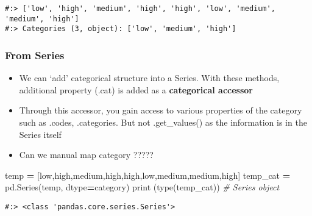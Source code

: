 \documentclass[
]{book}
\newenvironment{Shaded}{\begin{snugshade}}{\end{snugshade}}
\newcommand{\BuiltInTok}[1]{#1}
\newcommand{\CommentTok}[1]{\textcolor[rgb]{0.37,0.37,0.37}{\textit{#1}}}
\newcommand{\NormalTok}[1]{#1}
\newcommand{\OperatorTok}[1]{\textcolor[rgb]{0.43,0.43,0.43}{\textbf{#1}}}
\newcommand{\StringTok}[1]{\textcolor[rgb]{0.5,0.5,0.5}{#1}}
\providecommand{\tightlist}{%
  \setlength{\itemsep}{0pt}\setlength{\parskip}{0pt}}
\begin{document}
\begin{verbatim}
#:> ['low', 'high', 'medium', 'high', 'high', 'low', 'medium', 'medium', 'high']
#:> Categories (3, object): ['low', 'medium', 'high']
\end{verbatim}

\hypertarget{from-series}{%
\subsubsection{From Series}\label{from-series}}

\begin{itemize}
\tightlist
\item
  We can `add' categorical structure into a Series. With these methods, additional property (.cat) is added as a \textbf{categorical accessor}\\
\item
  Through this accessor, you gain access to various properties of the category such as .codes, .categories. But not .get\_values() as the information is in the Series itself\\
\item
  Can we manual map category ?????
\end{itemize}

\begin{Shaded}
\begin{Highlighting}[]
\NormalTok{temp }\OperatorTok{=}\NormalTok{ [}\StringTok{\textquotesingle{}low\textquotesingle{}}\NormalTok{,}\StringTok{\textquotesingle{}high\textquotesingle{}}\NormalTok{,}\StringTok{\textquotesingle{}medium\textquotesingle{}}\NormalTok{,}\StringTok{\textquotesingle{}high\textquotesingle{}}\NormalTok{,}\StringTok{\textquotesingle{}high\textquotesingle{}}\NormalTok{,}\StringTok{\textquotesingle{}low\textquotesingle{}}\NormalTok{,}\StringTok{\textquotesingle{}medium\textquotesingle{}}\NormalTok{,}\StringTok{\textquotesingle{}medium\textquotesingle{}}\NormalTok{,}\StringTok{\textquotesingle{}high\textquotesingle{}}\NormalTok{]}
\NormalTok{temp\_cat }\OperatorTok{=}\NormalTok{ pd.Series(temp, dtype}\OperatorTok{=}\StringTok{\textquotesingle{}category\textquotesingle{}}\NormalTok{)}
\BuiltInTok{print}\NormalTok{ (}\BuiltInTok{type}\NormalTok{(temp\_cat))       }\CommentTok{\# Series object}
\end{Highlighting}
\end{Shaded}

\begin{verbatim}
#:> <class 'pandas.core.series.Series'>
\end{verbatim}
\end{document}
